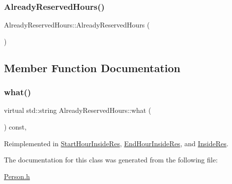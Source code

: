 \subsubsection{\texorpdfstring{Already\+Reserved\+Hours()}{AlreadyReservedHours()}}
{\footnotesize\ttfamily Already\+Reserved\+Hours\+::\+Already\+Reserved\+Hours (\begin{DoxyParamCaption}{ }\end{DoxyParamCaption})\hspace{0.3cm}{\ttfamily [inline]}}



\subsection{Member Function Documentation}
\mbox{\label{class_already_reserved_hours_a69081ef7e75aa68b9aa5c75d02fe2194}} 
\subsubsection{\texorpdfstring{what()}{what()}}
{\footnotesize\ttfamily virtual std\+::string Already\+Reserved\+Hours\+::what (\begin{DoxyParamCaption}{ }\end{DoxyParamCaption}) const\hspace{0.3cm}{\ttfamily [inline]}, {\ttfamily [virtual]}}



Reimplemented in \mbox{\hyperlink{class_start_hour_inside_res_a90b45cf2a2d4f0adcf7d9f650bee1574}{Start\+Hour\+Inside\+Res}}, \mbox{\hyperlink{class_end_hour_inside_res_afee9514b15c167847bc55ebe833076ff}{End\+Hour\+Inside\+Res}}, and \mbox{\hyperlink{class_inside_res_af8e96688976739ec91630a369d4b94e7}{Inside\+Res}}.



The documentation for this class was generated from the following file\+:\begin{DoxyCompactItemize}
\item 
\mbox{\hyperlink{_person_8h}{Person.\+h}}\end{DoxyCompactItemize}

